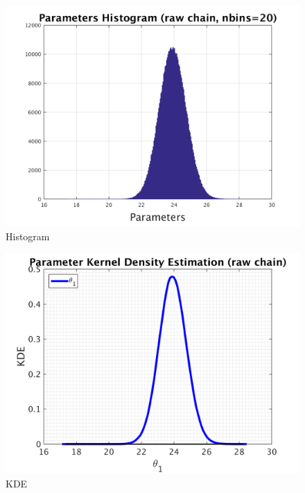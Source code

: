 \begin{figure}[H]
  
  \centering
   \includegraphics[scale=0.75]{100_results/outputData_500/simple_ip_hist_raw}
   \caption{Histogram}
\end{figure}



\begin{figure}[H]
  
  \centering
   \includegraphics[scale=0.75]{100_results/outputData_500/simple_ip_kde_raw}
   \caption{ KDE }
\end{figure}

